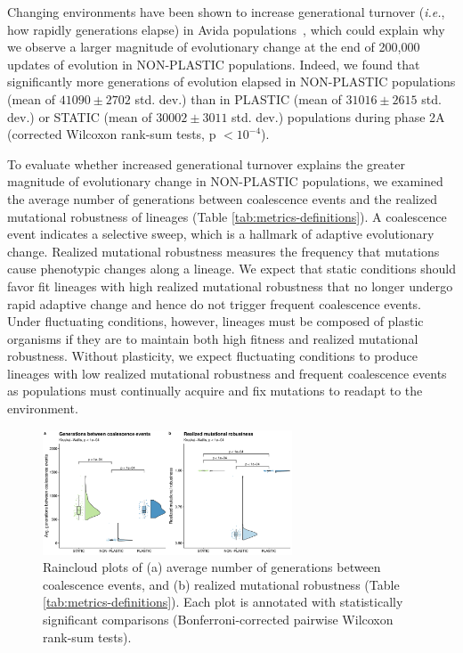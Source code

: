 \begin{raggedbottom}
Changing environments have been shown to increase generational turnover (\textit{i.e.}, how rapidly generations elapse) in Avida populations~\citep{canino-koning_evolution_2016}, which could explain why we observe a larger magnitude of evolutionary change at the end of 200,000 updates of evolution in NON-PLASTIC populations.
Indeed, we found that significantly more generations of evolution elapsed in NON-PLASTIC populations (mean of $41090\pm2702$ std. dev.) than in PLASTIC (mean of $31016\pm2615$ std. dev.) or STATIC (mean of $30002\pm3011$ std. dev.) populations during phase 2A (corrected Wilcoxon rank-sum tests, p $<10^{-4}$).

To evaluate whether increased generational turnover explains the greater magnitude of evolutionary change in NON-PLASTIC populations, we examined the average number of generations between coalescence events and the realized mutational robustness of lineages (Table \ref{tab:metrics-definitions}).
A coalescence event indicates a selective sweep, which is a hallmark of adaptive evolutionary change.
Realized mutational robustness measures the frequency that mutations cause phenotypic changes along a lineage.
We expect that static conditions should favor fit lineages with high realized mutational robustness that no longer undergo rapid adaptive change and hence do not trigger frequent coalescence events.
Under fluctuating conditions, however, lineages must be composed of plastic organisms if they are to maintain both high fitness and realized mutational robustness.
Without plasticity, we expect fluctuating conditions to produce lineages with low realized mutational robustness and frequent coalescence events as populations must continually acquire and fix mutations to readapt to the environment.

\begin{figure}[h!]
  \centering
  \includegraphics[width=0.66\textwidth]{02_consequences_of_plasticity/media/media-evolutionary-change-pace-panel.pdf}
  \caption{\small
  Raincloud plots of
  (a) average number of generations between coalescence events,
  and (b) realized mutational robustness (Table \ref{tab:metrics-definitions}).
  Each plot is annotated with statistically significant comparisons (Bonferroni-corrected pairwise Wilcoxon rank-sum tests).
  }
  \label{fig:evolutionary-dynamics-rate}
\end{figure}


\end{raggedbottom}
